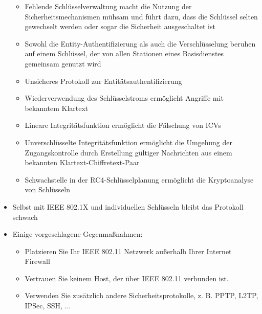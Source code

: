 \documentclass[a4paper]{article}
\begin{document}
\begin{multicols}{3}
\begin{itemize}
              \begin{itemize}
                  \item
                        Fehlende Schlüsselverwaltung macht die Nutzung der
                        Sicherheitsmechanismen mühsam und führt dazu, dass die Schlüssel
                        selten gewechselt werden oder sogar die Sicherheit ausgeschaltet ist
                  \item
                        Sowohl die Entity-Authentifizierung als auch die Verschlüsselung
                        beruhen auf einem Schlüssel, der von allen Stationen eines
                        Basisdienstes gemeinsam genutzt wird
                  \item
                        Unsicheres Protokoll zur Entitätsauthentifizierung
                  \item
                        Wiederverwendung des Schlüsselstroms ermöglicht Angriffe mit
                        bekanntem Klartext
                  \item
                        Lineare Integritätsfunktion ermöglicht die Fälschung von ICVs
                  \item
                        Unverschlüsselte Integritätsfunktion ermöglicht die Umgehung der
                        Zugangskontrolle durch Erstellung gültiger Nachrichten aus einem
                        bekannten Klartext-Chiffretext-Paar
                  \item
                        Schwachstelle in der RC4-Schlüsselplanung ermöglicht die
                        Kryptoanalyse von Schlüsseln
              \end{itemize}
        \item
              Selbst mit IEEE 802.1X und individuellen Schlüsseln bleibt das
              Protokoll schwach
        \item
              Einige vorgeschlagene Gegenmaßnahmen:

              \begin{itemize}
                  \item
                        Platzieren Sie Ihr IEEE 802.11 Netzwerk außerhalb Ihrer Internet
                        Firewall
                  \item
                        Vertrauen Sie keinem Host, der über IEEE 802.11 verbunden ist.
                  \item
                        Verwenden Sie zusätzlich andere Sicherheitsprotokolle, z. B. PPTP,
                        L2TP, IPSec, SSH, ...
              \end{itemize}
    \end{itemize}



\end{multicols}
\end{document}
